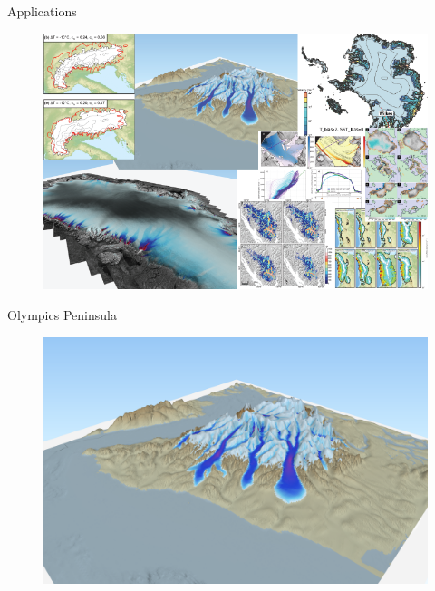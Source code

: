 \documentclass[hide notes,intlimits]{beamer}
\begin{document}
\begin{frame}{Applications}
  \begin{figure}
    \includegraphics[width=\textwidth]{pism-applications-composite-01}
  \end{figure}

\end{frame}


\begin{frame}{Olympics Peninsula}
  \begin{figure}
    \includegraphics[width=\textwidth]{olympics-3d}
  \end{figure}
  
\end{frame}
\end{document}
